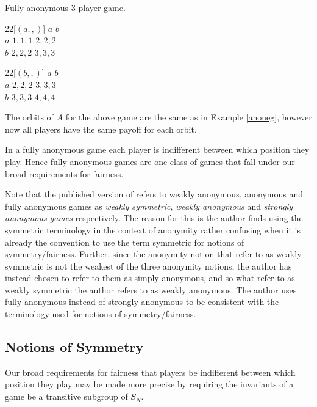 \begin{example}
		Fully anonymous 3-player game.
		\begin{center}
		\begin{game}{2}{2}[$(a,,)$]
			      \> $a$      \> $b$ \\
			$a$   \> $1,1,1$  \> $2,2,2$ \\
			$b$   \> $2,2,2$  \> $3,3,3$
		\end{game}
		\hspace*{10mm} 
		\begin{game}{2}{2}[$(b,,)$]
			      \> $a$     \> $b$ \\
			$a$   \> $2,2,2$ \> $3,3,3$ \\
			$b$   \> $3,3,3$ \> $4,4,4$
		\end{game}
		\end{center}
		The orbits of $A$ for the above game are the same as in Example \ref{anoneg}, however now all players have the same payoff for each orbit.
	\end{example}
	
In a fully anonymous game each player is indifferent between which position they play. Hence fully anonymous games are one class of games that fall under our broad requirements for fairness. 

Note that the published version of \cite{brandt2009symmetries} refers to weakly anonymous, anonymous and fully anonymous games as \textit{weakly symmetric}, \textit{weakly anonymous} and \textit{strongly anonymous games} respectively. The reason for this is the author finds using the symmetric terminology in the context of anonymity rather confusing when it is already the convention to use the term symmetric for notions of symmetry/fairness. Further, since the anonymity notion that \cite{brandt2009symmetries} refer to as weakly symmetric is not the weakest of the three anonymity notions, the author has instead chosen to refer to them as simply anonymous, and so what \cite{brandt2009symmetries} refer to as weakly symmetric the author refers to as weakly anonymous. The author uses fully anonymous instead of strongly anonymous to be consistent with the terminology used for notions of symmetry/fairness.

\subsection{Notions of Symmetry} \label{subsec:labeldepnotionsofsymmetry}
Our broad requirements for fairness that players be indifferent between which position they play may be made more precise by requiring the invariants of a game be a transitive subgroup of $S_N$.

